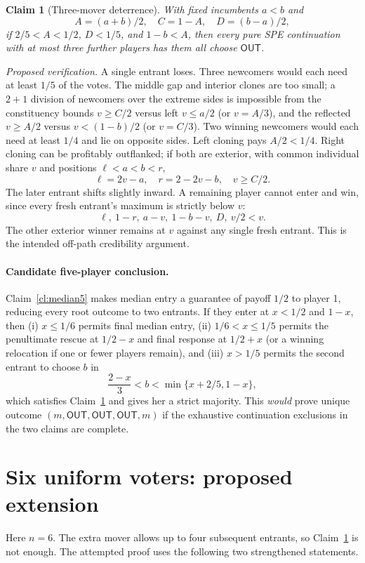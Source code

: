 \documentclass[10pt]{article}
\newtheorem{claim}{Claim}
\newcommand{\OUT}{\mathsf{OUT}}
\begin{document}
\begin{claim}[Three-mover deterrence]\label{cl:det3}
With fixed incumbents $a<b$ and
\[
 A=(a+b)/2,\quad C=1-A,\quad D=(b-a)/2,
\]
if $2/5<A<1/2$, $D<1/5$, and $1-b<A$, then every pure SPE continuation with at most three further players has them all choose $\OUT$.
\end{claim}
\noindent\emph{Proposed verification.} A single entrant loses. Three newcomers would each need at least $1/5$ of the votes. The middle gap and interior clones are too small; a $2+1$ division of newcomers over the extreme sides is impossible from the constituency bounds $v\ge C/2$ versus left $v\le a/2$ (or $v=A/3$), and the reflected $v\ge A/2$ versus $v<(1-b)/2$ (or $v=C/3$).
Two winning newcomers would each need at least $1/4$ and lie on opposite sides. Left cloning pays $A/2<1/4$. Right cloning can be profitably outflanked; if both are exterior, with common individual share $v$ and positions $\ell<a<b<r$,
\[
 \ell=2v-a,\quad r=2-2v-b,\quad v\ge C/2.
\]
The later entrant shifts slightly inward. A remaining player cannot enter and win, since every fresh entrant's maximum is strictly below $v$:
\[
 \ell,\ 1-r,\ a-v,\ 1-b-v,\ D,\ v/2<v.
\]
The other exterior winner remains at $v$ against any single fresh entrant. This is the intended off-path credibility argument.

\paragraph{Candidate five-player conclusion.}
Claim~\ref{cl:median5} makes median entry a guarantee of payoff $1/2$ to player 1, reducing every root outcome to two entrants. If they enter at $x<1/2$ and $1-x$, then (i) $x\le1/6$ permits final median entry, (ii) $1/6<x\le1/5$ permits the penultimate rescue at $1/2-x$ and final response at $1/2+x$ (or a winning relocation if one or fewer players remain), and (iii) $x>1/5$ permits the second entrant to choose $b$ in
\[
 \frac{2-x}{3}<b<\min\{x+2/5,1-x\},
\]
which satisfies Claim~\ref{cl:det3} and gives her a strict majority. This \emph{would} prove unique outcome $(m,\OUT,\OUT,\OUT,m)$ if the exhaustive continuation exclusions in the two claims are complete.

\section{Six uniform voters: proposed extension}\label{sec:six}
Here $n=6$. The extra mover allows up to four subsequent entrants, so Claim~\ref{cl:det3} is not enough. The attempted proof uses the following two strengthened statements.
\end{document}
